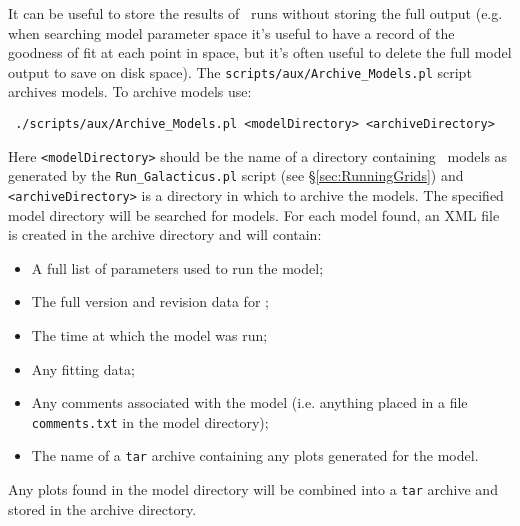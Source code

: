 It can be useful to store the results of \glc\ runs without storing the full output (e.g. when searching model parameter space it's useful to have a record of the goodness of fit at each point in space, but it's often useful to delete the full model output to save on disk space). The {\tt scripts/aux/Archive\_Models.pl} script archives models. To archive models use:
\begin{verbatim}
 ./scripts/aux/Archive_Models.pl <modelDirectory> <archiveDirectory>
\end{verbatim}
Here {\tt <modelDirectory>} should be the name of a directory containing \glc\ models as generated by the {\tt Run\_Galacticus.pl} script (see \S\ref{sec:RunningGrids}) and {\tt <archiveDirectory>} is a directory in which to archive the models. The specified model directory will be searched for models. For each model found, an XML file is created in the archive directory and will contain:
\begin{itemize}
 \item A full list of parameters used to run the model;
 \item The full version and revision data for \glc;
 \item The time at which the model was run;
 \item Any fitting data;
 \item Any comments associated with the model (i.e. anything placed in a file {\tt comments.txt} in the model directory);
 \item The name of a {\tt tar} archive containing any plots generated for the model.
\end{itemize}
Any plots found in the model directory will be combined into a {\tt tar} archive and stored in the archive directory.

